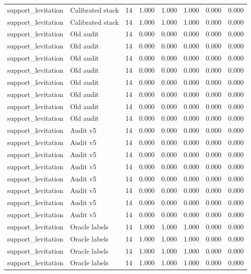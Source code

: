 {\begin{longtable}{llrrrrrr}
support\_levitation & Calibrated stack & 14 & 1.000 & 1.000 & 1.000 & 0.000 & 0.000 \\
support\_levitation & Calibrated stack & 14 & 1.000 & 1.000 & 1.000 & 0.000 & 0.000 \\
support\_levitation & Old audit & 14 & 0.000 & 0.000 & 0.000 & 0.000 & 0.000 \\
support\_levitation & Old audit & 14 & 0.000 & 0.000 & 0.000 & 0.000 & 0.000 \\
support\_levitation & Old audit & 14 & 0.000 & 0.000 & 0.000 & 0.000 & 0.000 \\
support\_levitation & Old audit & 14 & 0.000 & 0.000 & 0.000 & 0.000 & 0.000 \\
support\_levitation & Old audit & 14 & 0.000 & 0.000 & 0.000 & 0.000 & 0.000 \\
support\_levitation & Old audit & 14 & 0.000 & 0.000 & 0.000 & 0.000 & 0.000 \\
support\_levitation & Old audit & 14 & 0.000 & 0.000 & 0.000 & 0.000 & 0.000 \\
support\_levitation & Old audit & 14 & 0.000 & 0.000 & 0.000 & 0.000 & 0.000 \\
support\_levitation & Audit v5 & 14 & 0.000 & 0.000 & 0.000 & 0.000 & 0.000 \\
support\_levitation & Audit v5 & 14 & 0.000 & 0.000 & 0.000 & 0.000 & 0.000 \\
support\_levitation & Audit v5 & 14 & 0.000 & 0.000 & 0.000 & 0.000 & 0.000 \\
support\_levitation & Audit v5 & 14 & 0.000 & 0.000 & 0.000 & 0.000 & 0.000 \\
support\_levitation & Audit v5 & 14 & 0.000 & 0.000 & 0.000 & 0.000 & 0.000 \\
support\_levitation & Audit v5 & 14 & 0.000 & 0.000 & 0.000 & 0.000 & 0.000 \\
support\_levitation & Audit v5 & 14 & 0.000 & 0.000 & 0.000 & 0.000 & 0.000 \\
support\_levitation & Audit v5 & 14 & 0.000 & 0.000 & 0.000 & 0.000 & 0.000 \\
support\_levitation & Oracle labels & 14 & 1.000 & 1.000 & 1.000 & 0.000 & 0.000 \\
support\_levitation & Oracle labels & 14 & 1.000 & 1.000 & 1.000 & 0.000 & 0.000 \\
support\_levitation & Oracle labels & 14 & 1.000 & 1.000 & 1.000 & 0.000 & 0.000 \\
support\_levitation & Oracle labels & 14 & 1.000 & 1.000 & 1.000 & 0.000 & 0.000 \\

\end{longtable}}
